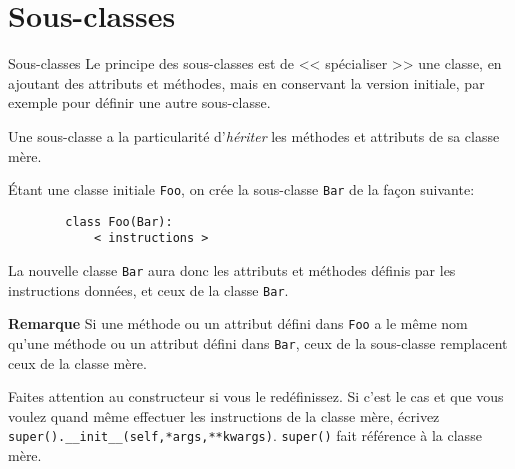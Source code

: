 \section{Sous-classes}

\begin{frame}[fragile]{Sous-classes}
	Le principe des sous-classes est de << spécialiser >> une classe, en ajoutant des attributs et méthodes, mais en conservant la version initiale, par exemple pour définir une autre sous-classe.\pause
	
	Une sous-classe a la particularité d'\textit{hériter} les méthodes et attributs de sa classe mère.\pause
\end{frame}

\begin{frame}[fragile]
	Étant une classe initiale \lstinline|Foo|, on crée la sous-classe \lstinline|Bar| de la façon suivante:
	\begin{lstlisting}
		class Foo(Bar):
			< instructions >
	\end{lstlisting}
	
	La nouvelle classe \lstinline|Bar| aura donc les attributs et méthodes définis par les instructions données, et ceux de la classe \lstinline|Bar|.\pause
	
	\textbf{Remarque} Si une méthode ou un attribut défini dans \lstinline|Foo| a le même nom qu'une méthode ou un attribut défini dans \lstinline|Bar|, ceux de la sous-classe remplacent ceux de la classe mère.\pause
	
	Faites attention au constructeur si vous le redéfinissez. Si c'est le cas et que vous voulez quand même effectuer les instructions de la classe mère, écrivez \lstinline|super().__init__(self,*args,**kwargs)|. \lstinline|super()| fait référence à la classe mère.
\end{frame}

